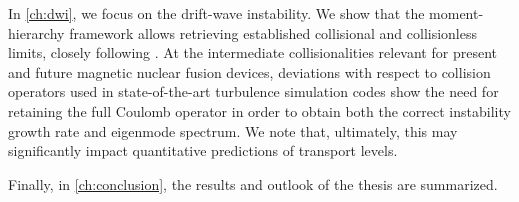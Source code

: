 In \cref{ch:dwi}, we focus on the drift-wave instability.
%
We show that the moment-hierarchy framework allows retrieving established collisional and collisionless limits, closely following \citep{Jorge2018}.
%
At the intermediate collisionalities relevant for present and future magnetic nuclear fusion devices, deviations with respect to collision operators used in state-of-the-art turbulence simulation codes show the need for retaining the full Coulomb operator in order to obtain both the correct instability growth rate and eigenmode spectrum.
%
We note that, ultimately, this may significantly impact quantitative predictions of transport levels.

Finally, in \cref{ch:conclusion}, the results and outlook of the thesis are summarized.